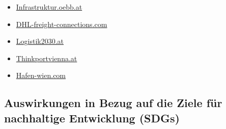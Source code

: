 \documentclass[
]{book}
\providecommand{\tightlist}{%
  \setlength{\itemsep}{0pt}\setlength{\parskip}{0pt}}
\begin{document}
\begin{itemize}
  \begin{itemize}
  \tightlist
  \item
    \href{https://infrastruktur.oebb.at/en/partners/terminals/locations/terminal-wien-sued}{Infrastruktur.oebb.at}
  \item
    \href{https://dhl-freight-connections.com/de/unternehmen/dhl-eroffnet-hochmodernes-logistikdrehkreuz-am-flughafen-wien/}{DHL-freight-connections.com}
  \item
    \href{https://www.logistik2030.at/?page_id=63}{Logistik2030.at}
  \item
    \href{https://www.thinkportvienna.at/ueber-uns/projekte/}{Thinkportvienna.at}
  \item
    \href{https://www.hafen-wien.com/de/home}{Hafen-wien.com}
  \end{itemize}
\end{itemize}

\hypertarget{auswirkungen-in-bezug-auf-die-ziele-fuxfcr-nachhaltige-entwicklung-sdgs-22}{%
\subsection*{Auswirkungen in Bezug auf die Ziele für nachhaltige Entwicklung (SDGs)}\label{auswirkungen-in-bezug-auf-die-ziele-fuxfcr-nachhaltige-entwicklung-sdgs-22}}
\end{document}
